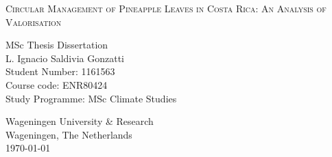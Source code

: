 \begin{titlepage}

\vspace*{2cm}
\centering
\begin{Large}\bfseries

\textsc{Circular Management of Pineapple Leaves in Costa Rica: An Analysis of Valorisation} 

\end{Large}

\vspace{3cm}

\begin{center}%

MSc Thesis Dissertation \\ \vspace{0.25cm}
L. Ignacio Saldivia Gonzatti  \\ \vspace{0.25cm}
 Student Number: 1161563 \\ \vspace{0.25cm}
Course code: ENR80424\\  \vspace{0.25cm}
Study Programme: MSc Climate Studies \vspace{0.25cm}

       \vfill
            
            
        Wageningen University \& Research\\
        Wageningen, The Netherlands\\
       \today

\end{center}
\end{titlepage}